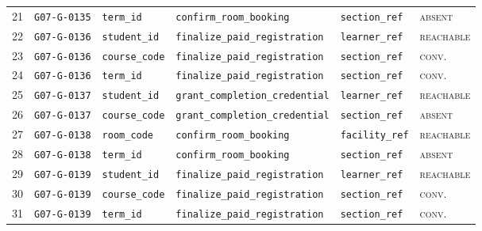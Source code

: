 \documentclass[11pt]{article}
\newcommand{\st}[1]{\textsc{\small #1}}
\begin{document}
\begin{longtable}{@{}rlllll@{}}
\footnotesize 21 & \texttt{\footnotesize G07-G-0135} & \texttt{\footnotesize term\_id} & \texttt{\footnotesize confirm\_room\_booking} & \texttt{\footnotesize section\_ref} & \st{absent} \\
\footnotesize 22 & \texttt{\footnotesize G07-G-0136} & \texttt{\footnotesize student\_id} & \texttt{\footnotesize finalize\_paid\_registration} & \texttt{\footnotesize learner\_ref} & \st{reachable} \\
\footnotesize 23 & \texttt{\footnotesize G07-G-0136} & \texttt{\footnotesize course\_code} & \texttt{\footnotesize finalize\_paid\_registration} & \texttt{\footnotesize section\_ref} & \st{conv.} \\
\footnotesize 24 & \texttt{\footnotesize G07-G-0136} & \texttt{\footnotesize term\_id} & \texttt{\footnotesize finalize\_paid\_registration} & \texttt{\footnotesize section\_ref} & \st{conv.} \\
\footnotesize 25 & \texttt{\footnotesize G07-G-0137} & \texttt{\footnotesize student\_id} & \texttt{\footnotesize grant\_completion\_credential} & \texttt{\footnotesize learner\_ref} & \st{reachable} \\
\footnotesize 26 & \texttt{\footnotesize G07-G-0137} & \texttt{\footnotesize course\_code} & \texttt{\footnotesize grant\_completion\_credential} & \texttt{\footnotesize section\_ref} & \st{absent} \\
\footnotesize 27 & \texttt{\footnotesize G07-G-0138} & \texttt{\footnotesize room\_code} & \texttt{\footnotesize confirm\_room\_booking} & \texttt{\footnotesize facility\_ref} & \st{reachable} \\
\footnotesize 28 & \texttt{\footnotesize G07-G-0138} & \texttt{\footnotesize term\_id} & \texttt{\footnotesize confirm\_room\_booking} & \texttt{\footnotesize section\_ref} & \st{absent} \\
\footnotesize 29 & \texttt{\footnotesize G07-G-0139} & \texttt{\footnotesize student\_id} & \texttt{\footnotesize finalize\_paid\_registration} & \texttt{\footnotesize learner\_ref} & \st{reachable} \\
\footnotesize 30 & \texttt{\footnotesize G07-G-0139} & \texttt{\footnotesize course\_code} & \texttt{\footnotesize finalize\_paid\_registration} & \texttt{\footnotesize section\_ref} & \st{conv.} \\
\footnotesize 31 & \texttt{\footnotesize G07-G-0139} & \texttt{\footnotesize term\_id} & \texttt{\footnotesize finalize\_paid\_registration} & \texttt{\footnotesize section\_ref} & \st{conv.} \\

\end{longtable}
\end{document}
